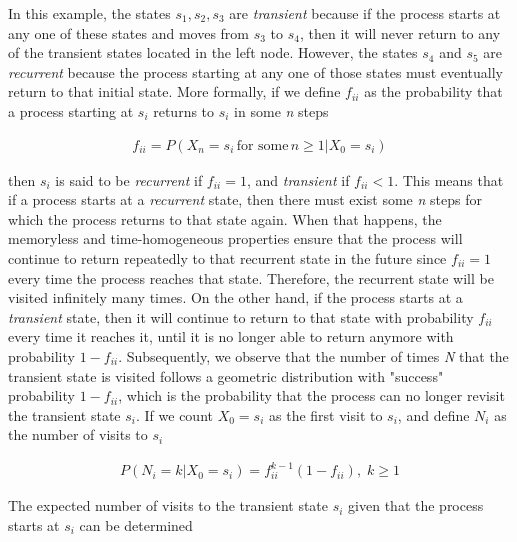 \documentclass[a4paper, 12pt]{article}
\begin{document}
	In this example, the states $s_1, s_2, s_3$ are \emph{transient} because if the process starts at any one of these states and moves from $s_3$ to $s_4$, then it will never return to any of the transient states located in the left node. However, the states $s_4$ and $s_5$ are \emph{recurrent} because the process starting at any one of those states must eventually return to that initial state. More formally, if we define $f_{ii}$ as the probability that a process starting at $s_i$ returns to $s_i$ in some \emph{n} steps
	
	\begin{equation*}
		\begin{aligned}
			f_{ii} = P(X_n = s_i \, \text{for some} \, n  \geq 1 | X_0 = s_i)
		\end{aligned}
	\end{equation*}
	 
	then $s_i$ is said to be \emph{recurrent} if $f_{ii} = 1$, and \emph{transient} if $f_{ii} < 1$. This means that if a process starts at a \emph{recurrent} state, then there must exist some \emph{n} steps for which the process returns to that state again. When that happens, the memoryless and time-homogeneous properties ensure that the process will continue to return repeatedly to that recurrent state in the future since $f_{ii} = 1$ every time the process reaches that state.  Therefore, the recurrent state will be visited infinitely many times. On the other hand, if the process starts at a \emph{transient} state, then it will continue to return to that state with probability $f_{ii}$ every time it reaches it, until it is no longer able to return anymore with probability $1 - f_{ii}$. Subsequently, we observe that the number of times \emph{N} that the transient state is visited follows a geometric distribution with "success" probability $1 - f_{ii}$, which is the probability that the process can no longer revisit the transient state $s_i$. If we  count $X_0 = s_i$ as the first visit to $s_i$, and define $N_i$ as the number of visits to $s_i$
	
	\begin{equation*}
	\begin{aligned}
		 P(N_i = k | X_0 = s_i) = f_{ii}^{k-1}(1-f_{ii}), \; k\geq1
	\end{aligned}
	\end{equation*}		
	
	The expected number of visits to the transient state $s_i$ given that the process starts at $s_i$ can be determined
	
\end{document}
